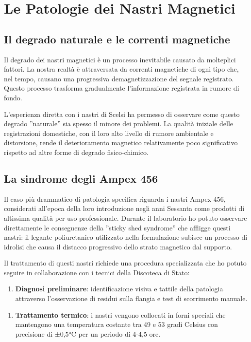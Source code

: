 
\section{Le Patologie dei Nastri Magnetici}
\subsection{Il degrado naturale e le correnti magnetiche}
Il degrado dei nastri magnetici è un processo inevitabile causato da molteplici fattori. La nostra realtà è attraversata da correnti magnetiche di ogni tipo che, nel tempo, causano una progressiva demagnetizzazione del segnale registrato. Questo processo trasforma gradualmente l'informazione registrata in rumore di fondo.

L'esperienza diretta con i nastri di Scelsi ha permesso di osservare come questo degrado ''naturale'' sia spesso il minore dei problemi. La qualità iniziale delle registrazioni domestiche, con il loro alto livello di rumore ambientale e distorsione, rende il deterioramento magnetico relativamente poco significativo rispetto ad altre forme di degrado fisico-chimico\cite[p. 170]{pro:scelsitapes2007}.
\subsection{La sindrome degli Ampex 456}
Il caso più drammatico di patologia specifica riguarda i nastri Ampex 456, considerati all'epoca della loro introduzione negli anni Sessanta come prodotti di altissima qualità per uso professionale. Durante il laboratorio ho potuto osservare direttamente le conseguenze della ''sticky shed syndrome'' che affligge questi nastri: il legante poliuretanico utilizzato nella formulazione subisce un processo di idrolisi che causa il distacco progressivo dello strato magnetico dal supporto.

Il trattamento di questi nastri richiede una procedura specializzata che ho potuto seguire in collaborazione con i tecnici della Discoteca di Stato:

\begin{enumerate}
    \item \textbf{Diagnosi preliminare}: identificazione visiva e tattile della patologia attraverso l'osservazione di residui sulla flangia e test di scorrimento manuale.
\end{enumerate}

\begin{enumerate}
    \item \textbf{Trattamento termico}: i nastri vengono collocati in forni speciali che mantengono una temperatura costante tra 49 e 53 gradi Celsius con precisione di ±0,5°C per un periodo di 4-4,5 ore.
\end{enumerate}

